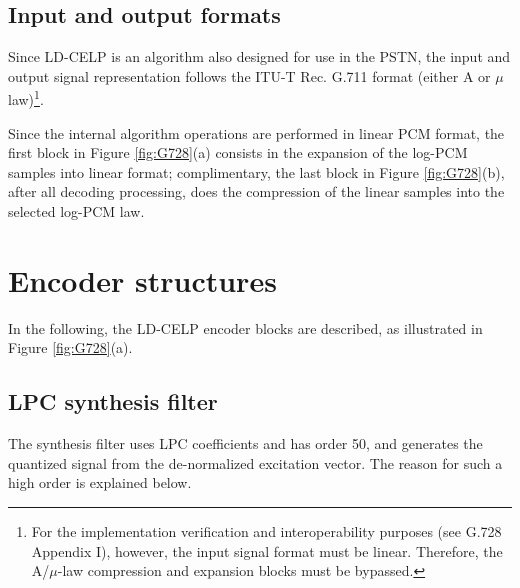 \subsection{Input and output formats} 

Since LD-CELP is an algorithm also designed for use in the PSTN, the
input and output signal representation follows the ITU-T Rec. G.711
format (either A or $\mu$ law)\footnote{\sf For the implementation
  verification and interoperability purposes (see G.728 Appendix I),
  however, the input signal format must be linear. Therefore, the
  A/$\mu$-law compression and expansion blocks must be bypassed.}.

Since the internal algorithm operations are performed in linear PCM
format, the first block in Figure \ref{fig:G728}(a) consists in the
expansion of the log-PCM samples into linear format; complimentary,
the last block in Figure \ref{fig:G728}(b), after all decoding
processing, does the compression of the linear samples into the
selected log-PCM law.

\section{Encoder structures}

In the following, the LD-CELP encoder blocks are
described, as illustrated in Figure \ref{fig:G728}(a). 

\subsection{LPC synthesis filter} 

The synthesis filter uses LPC coefficients and has order 50, and
generates the quantized signal from the de-normalized excitation
vector. The reason for such a high order is explained below.

